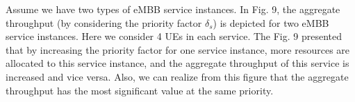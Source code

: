 \documentclass[lettersize,journal]{IEEEtran}
\begin{document}
Assume we have two types of eMBB service instances. In Fig. 9, the aggregate throughput (by considering the priority factor $\delta_s$) is depicted for two eMBB service instances. Here we consider 4 UEs in each service. %
The Fig. 9 presented that by increasing the priority factor for one service instance, more resources are allocated to this service instance, and the aggregate throughput of this service is increased and vice versa. Also, we can realize from this figure that the aggregate throughput has the most significant value at the same priority.
\end{document}
